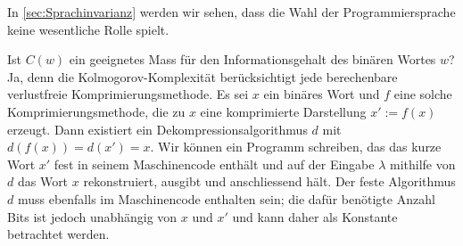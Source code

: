 \begin{myremark}
	In \cref{sec:Sprachinvarianz} werden wir sehen, dass die Wahl der Programmiersprache keine wesentliche Rolle spielt.
\end{myremark}
\begin{myremark}
	Ist $C(w)$ ein geeignetes Mass für den Informationsgehalt des binären Wortes $w$? Ja, denn die Kolmogorov-Komplexität berücksichtigt jede berechenbare verlustfreie Komprimierungsmethode. Es sei $x$ ein binäres Wort und $f$ eine solche Komprimierungsmethode, die zu $x$ eine komprimierte Darstellung $x':=f(x)$ erzeugt. Dann existiert ein Dekompressionsalgorithmus $d$ mit $d(f(x))=d(x')=x$. Wir können ein Programm schreiben, das das kurze Wort $x'$ fest in seinem Maschinencode enthält und auf der Eingabe $\lambda$ mithilfe von $d$ das Wort $x$ rekonstruiert, ausgibt und anschliessend hält. Der feste Algorithmus $d$ muss ebenfalls im Maschinencode enthalten sein; die dafür benötigte Anzahl Bits ist jedoch unabhängig von $x$ und $x'$ und kann daher als Konstante betrachtet werden.
\end{myremark}

